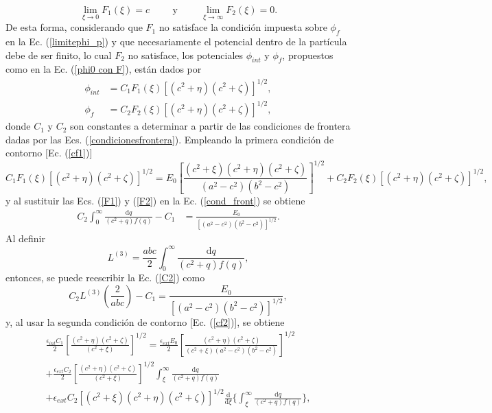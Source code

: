 \begin{equation}
    \lim_{\xi \to 0}F_1(\xi)=c\hspace{1cm}\mbox{y}\hspace{1cm} \lim_{\xi \to \infty}F_2(\xi)=0.
\end{equation}
De esta forma, considerando que $F_1$ no satisface la condición impuesta sobre $\phi_f$ en la Ec. (\ref{limitephi_p}) y que necesariamente el potencial dentro de la partícula debe de ser finito, lo cual $F_2$ no satisface, los potenciales $\phi_{int}$ y $\phi_f$, propuestos como en la Ec. (\ref{phi0 con F}), están dados por
\begin{align}
    \phi_{int}&=C_1F_1(\xi)[(c^2+\eta)(c^2+\zeta)]^{1/2}\label{phi_int},\\
    \phi_f&=C_2F_2(\xi)[(c^2+\eta)(c^2+\zeta)]^{1/2}\label{phi_p},
\end{align}
donde $C_1$ y $C_2$ son constantes a determinar a partir de las condiciones de frontera dadas por las Ecs. (\ref{condicionesfrontera}). Empleando la primera condición de contorno [Ec. (\ref{cf1})]
\begin{equation}
    C_1F_1(\xi)[(c^2+\eta)(c^2+\zeta)]^{1/2}=E_0\left[\frac{(c^2+\xi)(c^2+\eta)(c^2+\zeta)}{(a^2-c^2)(b^2-c^2)}\right]^{1/2}+C_2F_2(\xi)[(c^2+\eta)(c^2+\zeta)]^{1/2},
    \label{cond_front}
\end{equation}
y al sustituir las Ecs. (\ref{F1}) y (\ref{F2}) en la Ec. (\ref{cond_front}) se obtiene
\begin{align}
    C_2 \int_{0}^{\infty}\frac{\text{d}q}{(c^2+q)f(q)}-C_1&=\frac{E_0}{[(a^2-c^2)(b^2-c^2)]^{1/2}}.
    \label{C2}
\end{align}
Al definir
\begin{equation}
    L^{(3)}=\frac{abc}{2}\int_{0}^{\infty}\frac{\text{d}q}{(c^2+q)f(q)},
\end{equation}
entonces, se puede reescribir la Ec. (\ref{C2}) como
\begin{equation}
    C_2L^{(3)}\left(\frac{2}{abc}\right)-C_1=\frac{E_0}{[(a^2-c^2)(b^2-c^2)]^{1/2}},
    \label{ec1 de cf}
\end{equation}
y, al usar la segunda condición de contorno [Ec. (\ref{cf2})], se obtiene
\begin{multline*}
	\frac{\epsilon_{int} C_1}{2}\left[\frac{(c^2+\eta)(c^2+\zeta)}{(c^2+\xi)}\right]^{1/2} 
	= \frac{\epsilon_{ext} E_0}{2}\left[\frac{(c^2+\eta)(c^2+\zeta)}{(c^2+\xi)(a^2-c^2)(b^2-c^2)}\right]^{1/2} \\
	+ \frac{\epsilon_{ext} C_2}{2}\left[\frac{(c^2+\eta)(c^2+\zeta)}{(c^2+\xi)}\right]^{1/2}
	\int_{\xi}^{\infty}\frac{\text{d}q}{(c^2+q)f(q)} \\
	+ \epsilon_{ext} C_2[(c^2+\xi)(c^2+\eta)(c^2+\zeta)]^{1/2}
	\frac{\text{d}}{\text{d}\xi} \Bigg\{\int_{\xi}^{\infty}\frac{\text{d}q}{(c^2+q)f(q)}\Bigg\},
\end{multline*}
